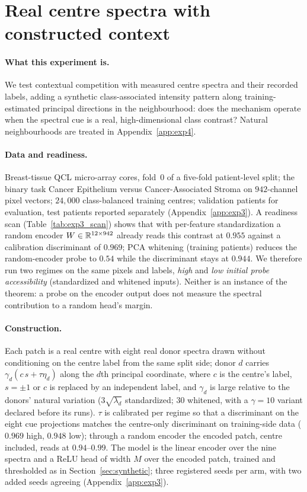 \section{Real centre spectra with constructed context}
\label{sec:real}

\paragraph{What this experiment is.}
We test contextual competition with measured centre spectra and their
recorded labels, adding a synthetic class-associated intensity pattern
along training-estimated principal directions in the neighbourhood: does
the mechanism operate when the spectral cue is a real, high-dimensional
class contrast? Natural neighbourhoods are treated in
Appendix~\ref{app:exp4}.

\paragraph{Data and readiness.}
Breast-tissue QCL micro-array cores, fold~0 of a five-fold patient-level
split; the binary task Cancer Epithelium versus Cancer-Associated Stroma
on $942$-channel pixel vectors; $24{,}000$ class-balanced training
centres; validation patients for evaluation, test patients reported
separately (Appendix~\ref{app:exp3}). A readiness scan
(Table~\ref{tab:exp3_scan}) shows that with per-feature standardization a
random encoder $W\in\mathbb{R}^{12\times942}$ already reads this contrast at
$0.955$ against a calibration discriminant of $0.969$; PCA
whitening (training patients) reduces the random-encoder probe to $0.54$
while the discriminant stays at $0.944$. We therefore run
two regimes on the same pixels and labels, \emph{high} and \emph{low
initial probe accessibility} (standardized and whitened inputs). Neither
is an instance of the theorem: a probe on the encoder output does not
measure the spectral contribution to a random head's margin.

\paragraph{Construction.}
Each patch is a real centre with eight real donor spectra drawn without
conditioning on the centre label from the same split side; donor $d$
carries $\gamma_d(c\,s+\tau\eta_d)$ along the $d$th principal coordinate,
where $c$ is the centre's label, $s=\pm1$ or $c$ is replaced by an
independent label, and $\gamma_d$ is large relative to the donors'
natural variation ($3\sqrt{\lambda_d}$ standardized; $30$ whitened, with
a $\gamma=10$ variant declared before its runs). $\tau$ is
calibrated per regime so that a discriminant on the eight cue projections
matches the centre-only discriminant on training-side data ($0.969$ high,
$0.948$ low); through a random encoder the encoded patch, centre
included, reads at $0.94$--$0.99$. The model is the linear encoder over the nine
spectra and a ReLU head of width $M$ over the encoded patch, trained and
thresholded as in Section~\ref{sec:synthetic}; three registered seeds per
arm, with two added seeds agreeing (Appendix~\ref{app:exp3}).

